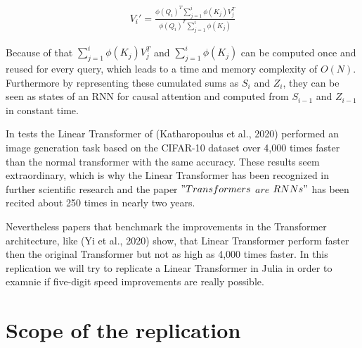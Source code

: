 \documentclass[DIV=13,fontsize=11pt]{scrartcl}
\begin{document}
\begin{align}
    V_{i}' {=} \frac{\phi(Q_{i})^T \sum_{j=1}^{i} \phi(K_{j})V_{j}^T}{\phi(Q_{i})^T \sum_{j=1}^{i}\phi(K_{j})}
\end{align}

Because of that \(\sum_{j=1}^{i} \phi(K_{j})V_{j}^T\) and \(\sum_{j=1}^{i}\phi(K_{j})\) can be computed once and reused for every query, which leads to a time and memory complexity of \(O(N)\). Furthermore by representing these cumulated sums as \(S_{i}\) and \(Z_{i}\), they can be seen as states of an RNN for causal attention and computed from \(S_{i-1}\) and \(Z_{i-1}\) in constant time.

In tests the Linear Transformer of (Katharopoulus et al., 2020) performed an image generation task based on the CIFAR-10 dataset over 4,000 times faster than the normal transformer with the same accuracy.  These results seem extraordinary, which is why the Linear Transformer has been recognized in further scientific research and the paper \("Transformers\) \( are\) \(RNNs"\) has been recited about 250 times in nearly two years. 

Nevertheless papers that benchmark the improvements in the Transformer architecture, like (Yi et al., 2020) show, that Linear Transformer perform faster then the original Transformer but not as high as 4,000 times faster. In this replication we will try to replicate a Linear Transformer in Julia in order to examnie if five-digit speed improvements are really possible.







\section{Scope of the replication}
    
\end{document}
